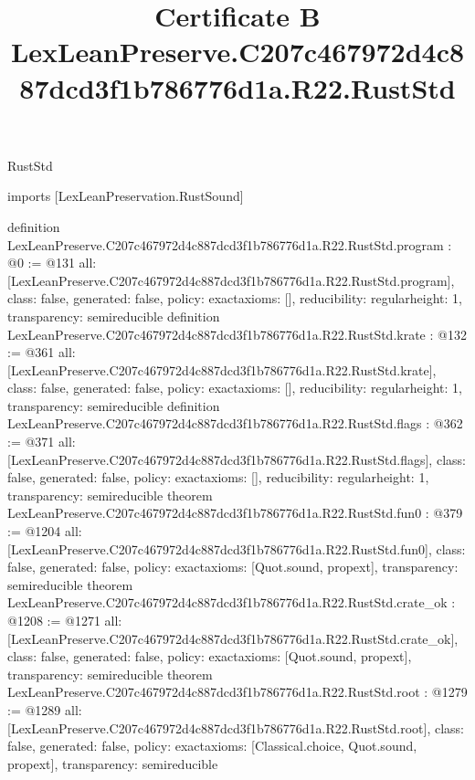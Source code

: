 \begin{lexlean}{RustStd}
\title{Certificate B LexLeanPreserve.C207c467972d4c887dcd3f1b786776d1a.R22.RustStd}
\begin{coremodule}
imports [LexLeanPreservation.RustSound]

definition LexLeanPreserve.C207c467972d4c887dcd3f1b786776d1a.R22.RustStd.program : @0 := @131 {
  all: [LexLeanPreserve.C207c467972d4c887dcd3f1b786776d1a.R22.RustStd.program],
  class: false,
  generated: false,
  policy: exact{axioms: []},
  reducibility: regular{height: 1},
  transparency: semireducible
}
definition LexLeanPreserve.C207c467972d4c887dcd3f1b786776d1a.R22.RustStd.krate : @132 := @361 {
  all: [LexLeanPreserve.C207c467972d4c887dcd3f1b786776d1a.R22.RustStd.krate],
  class: false,
  generated: false,
  policy: exact{axioms: []},
  reducibility: regular{height: 1},
  transparency: semireducible
}
definition LexLeanPreserve.C207c467972d4c887dcd3f1b786776d1a.R22.RustStd.flags : @362 := @371 {
  all: [LexLeanPreserve.C207c467972d4c887dcd3f1b786776d1a.R22.RustStd.flags],
  class: false,
  generated: false,
  policy: exact{axioms: []},
  reducibility: regular{height: 1},
  transparency: semireducible
}
theorem LexLeanPreserve.C207c467972d4c887dcd3f1b786776d1a.R22.RustStd.fun0 : @379 := @1204 {
  all: [LexLeanPreserve.C207c467972d4c887dcd3f1b786776d1a.R22.RustStd.fun0],
  class: false,
  generated: false,
  policy: exact{axioms: [Quot.sound, propext]},
  transparency: semireducible
}
theorem LexLeanPreserve.C207c467972d4c887dcd3f1b786776d1a.R22.RustStd.crate_ok : @1208 := @1271 {
  all: [LexLeanPreserve.C207c467972d4c887dcd3f1b786776d1a.R22.RustStd.crate_ok],
  class: false,
  generated: false,
  policy: exact{axioms: [Quot.sound, propext]},
  transparency: semireducible
}
theorem LexLeanPreserve.C207c467972d4c887dcd3f1b786776d1a.R22.RustStd.root : @1279 := @1289 {
  all: [LexLeanPreserve.C207c467972d4c887dcd3f1b786776d1a.R22.RustStd.root],
  class: false,
  generated: false,
  policy: exact{axioms: [Classical.choice, Quot.sound, propext]},
  transparency: semireducible
}


\end{coremodule}
\end{lexlean}
